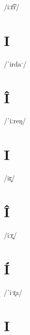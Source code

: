 \documentclass[10pt,a4paper,twoside]{book}
\begin{document}
\begin{multicols}{3}
 {/iːr͡r/} {}
\end{multicols}

\section*{I}

\begin{multicols}{3}
 {/ˈirdaˑ/} {}
\end{multicols}

\section*{Î}

\begin{multicols}{3}
 {/ˈiːreŋ/} {}
\end{multicols}

\section*{I}

\begin{multicols}{3}
 {/ir̥/} {}
\end{multicols}

\section*{Î}

\begin{multicols}{3}
 {/iːr̥/} {}
\end{multicols}

\section*{Í}

\begin{multicols}{3}
 {/ˈiˑr̥a/} {}
\end{multicols}

\section*{I}
\end{document}
